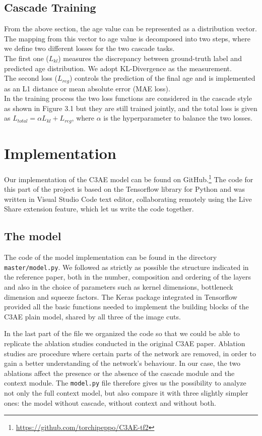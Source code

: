 \subsection*{Cascade Training}
From the above section, the age value can be represented as a distribution vector. The mapping from this 
vector to age value is decomposed into two steps, where we define two different losses for the two cascade 
tasks.\\
The first one ($L_{kl}$) measures the discrepancy between ground-truth label and predicted age distribution.
We adopt KL-Divergence as the measurement.\\
The second loss ($L_{reg}$) controls the prediction of the final age and is implemented as an L1 distance
or mean absolute error (MAE loss).\\
In the training process the two loss functions are considered in the cascade style as shown in Figure 3.1 
but they are still trained jointly, and the total loss is given as
$L_{total} = \alpha L_{kl} + L_{reg}$, where $\alpha$ is the hyperparameter to balance the two losses.

\section{Implementation}
Our implementation of the C3AE model can be found on
GitHub.\footnote{\url{https://github.com/torchipeppo/C3AE-tf2}}
The code for this part of the project is based on the Tensorflow library for Python and was written in 
Visual Studio Code text editor, collaborating remotely using the Live Share extension feature, which let 
us write the code together.
\subsection*{The model}
The code of the model implementation can be found in the directory \texttt{master/model.py}. We followed 
as strictly as possible the structure indicated in the reference paper, both in the number, composition 
and ordering of the layers and also in the choice of parameters such as kernel dimensions, bottleneck
dimension and squeeze factors.
The Keras package integrated in Tensorflow provided all the basic functions needed to implement the
building blocks of the C3AE plain model, shared by all three of the image cuts.


In the last part of the file we organized the code so that we could be able to replicate the ablation
studies conducted in the original C3AE paper. Ablation studies are procedure where certain parts of the 
network are removed, in order to gain a better understanding of the network’s behaviour. In our case, 
the two ablations affect the presence or the absence of the cascade module and the context module.
The \texttt{model.py} file therefore gives us the possibility to analyze not only the full context 
model, but also compare it with three slightly simpler ones: the model without cascade, without context 
and without both.


